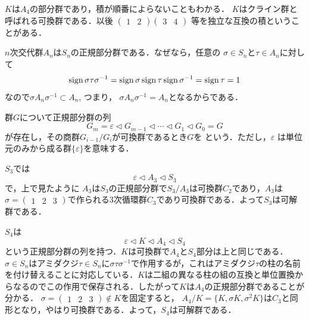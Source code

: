 \noindent
$K$は$A_4$の部分群であり，積が順番によらないこともわかる．
$K$はクライン群と呼ばれる可換群である．以後
$\begin{pmatrix}1&2\end{pmatrix}\begin{pmatrix}3&4\end{pmatrix}$
等を独立な互換の積ということがある．

$n$次交代群$A_n$は$S_n$の正規部分群である．なぜなら，任意の
$\sigma \in S_n$と$\tau\in A_n$に対して
\[
     \operatorname{sign}\sigma\tau\sigma^{-1}
     =\operatorname{sign}\sigma\operatorname{sign}\tau\operatorname{sign}\sigma^{-1}
     =\operatorname{sign}\tau=1
\]
なので$\sigma A_n\sigma^{-1}\subset A_n$, つまり，
$\sigma A_n\sigma^{-1}= A_n$となるからである．
\emptyline


群$G$について正規部分群の列
\[
     G_m=\varepsilon\lhd  G_{m-1}\lhd \cdots  \lhd G_1\lhd  G_0=G
\]
が存在し，その商群$G_{i-1}/G_{i}$が可換群であるとき$G$を
という．ただし，$\varepsilon$ は単位元のみから成る群$\{\varepsilon\}$を意味する．

\emptyline
$S_3$では
\[
     \varepsilon\lhd   A_3 \lhd  S_3
\]
で，上で見たように
$ A_3$は$ S_3$の正規部分群で$S_3/ A_3$は可換群$C_2$であり，$A_3$は$\sigma=\begin{pmatrix}1&2&3\end{pmatrix}$で作られる$3$次循環群$C_3$であり可換群である．よって$S_3$は可解群である．
\emptyline

$S_4$は
\[
     \varepsilon\lhd  K\lhd  A_4 \lhd S_4
\]
という正規部分群の列を持つ．$K$は可換群で$ A_4$と$ S_4$部分は上と同じである．$\sigma\in S_n$はアミダクジ$\tau\in S_n$に$\sigma\tau\sigma^{-1}$で作用するが，これはアミダクジ$\tau$の柱の名前を付け替えることに対応している．$K$は二組の異なる柱の組の互換と単位置換からなるのでこの作用で保存される．したがって$K$は$A_4$の正規部分群であることが分かる．
$\sigma=\begin{pmatrix}1&2&3\end{pmatrix}\notin K$を固定すると，
$A_4/K=\{K, \sigma K, \sigma^{2}K\}$は$C_3$と同形となり，やはり可換群である．よって，$S_4$は可解群である．

